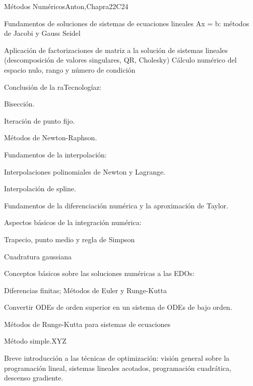 \begin{syllabus}
\begin{unit}{Métodos Numéricos}{}{Anton,Chapra}{22}{C24}
   \begin{topics}
    \item Fundamentos de soluciones de sistemas de ecuaciones lineales Ax = b: métodos de Jacobi y Gauss Seidel
    \item Aplicación de factorizaciones de matriz a la solución de sistemas lineales (descomposición de valores singulares, QR, Cholesky) Cálculo numérico del espacio nulo, rango y número de condición
    \item Conclusión de la raTecnologíaz:
	  \begin{subtopics}
	    \item Bisección.
	    \item Iteración de punto fijo.
	    \item Métodos de Newton-Raphson.
	  \end{subtopics}
    \item Fundamentos de la interpolación:
	  \begin{subtopics}
	    \item Interpolaciones polinomiales de Newton y Lagrange.
	    \item Interpolación de spline.
	    \end{subtopics}
    \item Fundamentos de la diferenciación numérica y la aproximación de Taylor.
    \item Aspectos básicos de la integración numérica:
	  \begin{subtopics}
	    \item Trapecio, punto medio y regla de Simpson 
	    \item Cuadratura gaussiana
	  \end{subtopics}
    \item Conceptos básicos sobre las soluciones numéricas a las EDOs:
	  \begin{subtopics}
	    \item Diferencias finitas; Métodos de Euler y Runge-Kutta
	    \item Convertir ODEs de orden superior en un sistema de ODEs de bajo orden.
	    \item Métodos de Runge-Kutta para sistemas de ecuaciones
	    \item Método simple.XYZ
	  \end{subtopics}
    \item Breve introducción a las técnicas de optimización: visión general sobre la programación lineal, sistemas lineales acotados, programación cuadrática, descenso gradiente.
    \end{topics}


\end{unit}
\end{syllabus}
